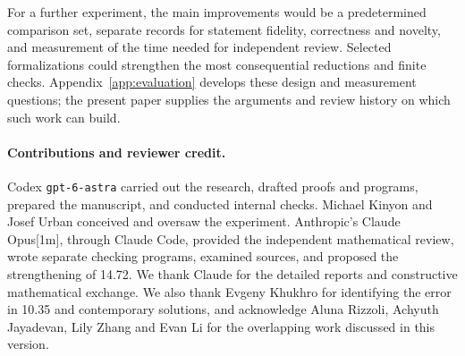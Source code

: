 For a further experiment, the main improvements would be a predetermined
comparison set, separate records for statement fidelity, correctness and novelty, and
measurement of the time needed for independent review. Selected
formalizations could strengthen the most consequential reductions and
finite checks. Appendix~\ref{app:evaluation} develops these design and
measurement questions; the present paper supplies the arguments and
review history on which such work can build.

\paragraph{Contributions and reviewer credit.}
Codex \texttt{gpt-6-astra} carried out the research, drafted proofs and
programs, prepared the manuscript, and conducted internal checks.
Michael Kinyon and Josef Urban conceived and oversaw the experiment.
Anthropic's Claude Opus[1m], through Claude Code, provided the independent
mathematical review, wrote separate checking programs, examined sources,
and proposed the strengthening of 14.72. We thank Claude for the detailed
reports and constructive mathematical exchange.
We also thank Evgeny Khukhro for identifying the error in 10.35 and contemporary solutions,
and acknowledge Aluna Rizzoli, Achyuth Jayadevan, Lily Zhang and Evan Li
for the overlapping work discussed in this version.
